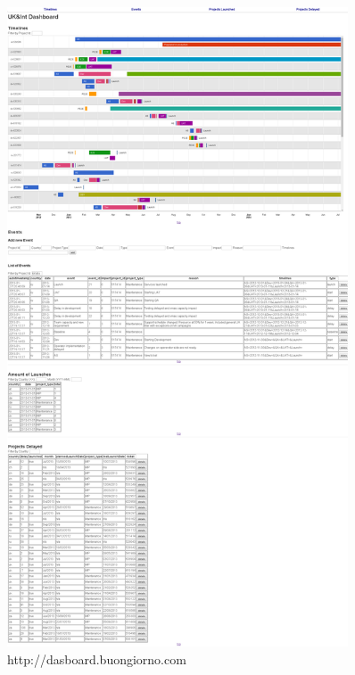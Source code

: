 \begin{figure}[ht!]
	\centering
   	\includegraphics[width=0.9\textwidth]{./resources/dashboard.png}
   	\caption{http://dasboard.buongiorno.com}
   	\label{f_dashboard}
\end{figure}

%
